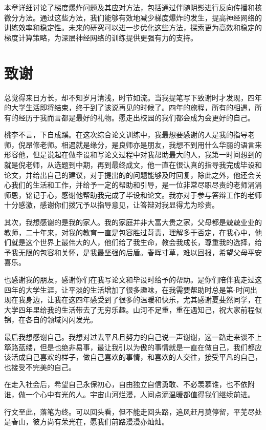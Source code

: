 \documentclass[12pt,a4paper]{amsart}
\begin{document}
本章详细讨论了梯度爆炸问题及其应对方法，包括通过伴随阴影进行反向传播和核微分方法。通过这些方法，我们能够有效地减少梯度爆炸的发生，提高神经网络的训练效率和稳定性。未来的研究可以进一步优化这些方法，探索更为高效和稳定的梯度计算策略，为深层神经网络的训练提供更强有力的支持。

\section{致谢}

总觉得来日方长，却不知岁月清浅，时节如流。当我提笔写下致谢时才发现，四年的大学生活即将结束，终于到了该说再见的时候了。四年的旅程，所有的相遇，所有的经历于我而言都是最好的礼物。愿走出校园的我们都会成为会更好的自己。

桃李不言，下自成蹊。在这次综合论文训练中，我最想要感谢的人是我的指导老师，倪昂修老师。相遇就是缘分，是良师亦是朋友，我想不到用什么华丽的语言来形容他，但是说起在做毕设和写论文过程中对我帮助最大的人，我第一时间想到的就是倪老师，从选题到中期，再到最终成文，他一直在很认真的指导我完成毕设和论文，并给出自己的建议，对于提出的的问题能够及时回复，除此之外，他还会关心我们的生活和工作，并给予一定的帮助和引导，是一位非常尽职尽责的老师涓涓师恩，铭记于心，感谢他帮助我完成了毕设和论文。我亦对于参与答辩工作的老师十分感激，感谢你们拨冗予以指导意见，让答辩对我显得尤为珍贵。

其次，我想感谢的是我的家人。我的家庭并非大富大贵之家，父母都是兢兢业业的教师，二十年来，对我的教育一直是包容胜过苛责，理解多于否定，在我心中，他们就是这个世界上最伟大的人，他们给了我生命，教会我成长，尊重我的选择，给予我无限的包容和关怀，是我最坚强的后盾。春晖寸草，难以回报，希望父母平安喜乐。

也感谢我的朋友，感谢你们在我写论文和毕设时给予的帮助。是你们陪伴我走过这四年的大学生涯，让平淡的生活增加了很多趣味，在我需要帮助时总是第-时间出现在我身边，让我在这四年感受到了很多的温暖和快乐，尤其感谢夏斐然同学，在大学四年里给我的生活带去了无穷乐趣。山河不足重，重在遇知己，祝大家前程似锦，在各自的领域闪闪发光。

最后我想感谢自己。我想对过去平凡且努力的自己说一声谢谢，这一路走来谈不上筚路蓝缕，但是也绝非易事，最让我引以为傲的事情就是一直在做自己，我们都应该活成自己喜欢的样子，做自己喜欢的事情，和喜欢的人交往，接受平凡的自己，也接受不完美的自己。

在走入社会后，希望自己永保初心，自由独立自信勇敢、不必羡慕谁，也不依附谁，做一个心中有光的人。宇宙山河烂漫，人间点滴温暖都值得我们继续前进。

行文至此，落笔为终。可以回头看，但不能走回头路，追风赶月莫停留，平芜尽处是春山，彼方尚有荣光在，愿我们前路漫漫亦灿灿。

\appendix

{\footnotesize}
\end{document}
